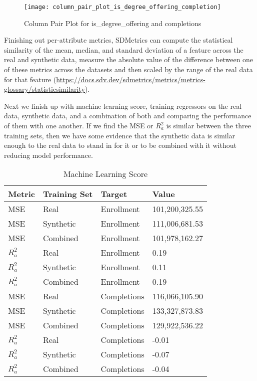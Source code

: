 \documentclass[sigconf, authorversion, nonacm]{acmart}
\begin{document}
    \begin{figure}[h]
        \centering
        \caption{Column Pair Plot for is\_degree\_offering and completions}
        \texttt{[image: column\_pair\_plot\_is\_degree\_offering\_completion]}
    \end{figure}

    Finishing out per-attribute metrics, SDMetrics can compute the statistical similarity of the mean, median, and standard deviation of a feature across the real and synthetic data, measure the absolute value of the difference between one of these metrics across the datasets and then scaled by the range of the real data for that feature (\href{https://docs.sdv.dev/sdmetrics/metrics/metrics-glossary/statisticsimilarity}{https://docs.sdv.dev/sdmetrics/metrics/metrics-glossary/statisticsimilarity}).

    Next we finish up with machine learning score, training regressors on the real data, synthetic data, and a combination of both and comparing the performance of them with one another. If we find the MSE or $R^2_a$ is similar between the three training sets, then we have some evidence that the synthetic data is similar enough to the real data to stand in for it or to be combined with it without reducing model performance.

    \begin{table}
        \caption{Machine Learning Score}
        \begin{tabular}{llll}
            \toprule
            Metric & Training Set & Target & Value \\
            \midrule
            MSE & Real & Enrollment & 101,200,325.55 \\
            MSE & Synthetic & Enrollment & 111,006,681.53 \\
            MSE & Combined & Enrollment & 101,978,162.27 \\
            $R^2_a$ & Real & Enrollment & 0.19 \\
            $R^2_a$ & Synthetic & Enrollment & 0.11 \\
            $R^2_a$ & Combined & Enrollment & 0.19 \\
            MSE & Real & Completions & 116,066,105.90 \\
            MSE & Synthetic & Completions & 133,327,873.83 \\
            MSE & Combined & Completions & 129,922,536.22 \\
            $R^2_a$ & Real & Completions & -0.01 \\
            $R^2_a$ & Synthetic & Completions & -0.07 \\
            $R^2_a$ & Combined & Completions & -0.04 \\
            \bottomrule
        \end{tabular}
    \end{table}
\end{document}
